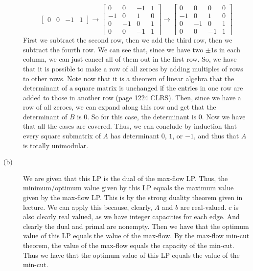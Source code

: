 \documentclass{article}
\begin{document}
\begin{description}
\[\begin{bmatrix}
         0 & 0 & -1 & 1
        \end{bmatrix} \rightarrow
        \begin{bmatrix}
         0 & 0 & -1 & 1\\
        -1 & 0 & 1 & 0\\
         0 & -1 & 0 & 1\\
         0 & 0 & -1 & 1
        \end{bmatrix} \rightarrow
        \begin{bmatrix}
         0 & 0 & 0 & 0\\
        -1 & 0 & 1 & 0\\
         0 & -1 & 0 & 1\\
         0 & 0 & -1 & 1
        \end{bmatrix}
        \]
        First we subtract the second row, then we add the third row, then we
        subtract the fourth row. We can see that, since we have two $\pm1$s in
        each column, we can just cancel all of them out in the first row.
        So, we have that it is possible to make a row of all zeroes by adding
        multiples of rows to other rows. Note now that it is a theorem of linear
        algebra that the determinant of a square matrix is unchanged if the
        entries in one row are added to those in another row (page 1224 CLRS).
        Then, since we have a row of all zeroes, we can expand along this row
        and get that the determinant of $B$ is $0$. So for this case, the determinant
        is $0$. Now we have that all the cases are covered. Thus, we can
        conclude by induction that every square submatrix of $A$ has determinant
        $0$, $1$, or $-1$, and thus that $A$ is totally unimodular.
    \item[(b)] We are given that this LP is the dual of the max-flow LP. Thus,
        the minimum/optimum value given by this LP equals the maximum value
        given by the max-flow LP. This is by the strong duality theorem given in
        lecture. We can apply this because, clearly, $A$ and $b$ are
        real-valued. $c$ is also clearly real valued, as we have integer
        capacities for each edge. And clearly the dual and primal are nonempty.
        Then we have that the optimum value of this LP equals the value of the max-flow.
        By the max-flow min-cut theorem, the value of the max-flow equals the
        capacity of the min-cut. Thus we have that the optimum value of this LP equals
        the value of the min-cut.
\end{description}
\newpage

\end{document}
